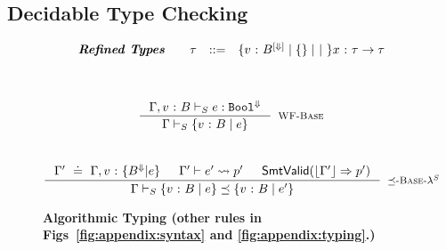 \subsection{Decidable Type Checking}
\begin{figure}[t!]
\centering
$$
\begin{array}{rrcl}
\textbf{\emph{Refined Types}} \quad
  & \tau
  & ::=   & \{ {v} \ \text{:}\ {B^{[\Downarrow]}} \mid {\ensuremath{\{ \} \mid \ \mid \  \}}} {x} \ \text{:}\ {\tau} \rightarrow \tau
\\[0.10in]
\end{array}
$$
\hfill{\fbox{\aiswellformed{\env}{\typ}}}\\
$$
\inference{
  \ahastype{\env,\tbind{v}{\btyp}}{\refa}{\tbool^{\tlabel}}
}{
  \aiswellformed{\env}{\tref{v}{\btyp}{\refa}}
}[\rwbase]
$$
\hfill{}\\
$$
\inference{
\env' \defeq \env,\tbind{v}{\{\btyp^\tlabel | \refa\}} &
\tologicshort{\env'}{\refa'}{\tbool}{\pred'}{}{}{} &
\smtvalid{\vcond{\env'}{\pred'}}
%
}{
 \aissubtype{\env}{\tref{v}{\btyp}{\refa}}{\tref{v}{\btyp}{\refa'}}
}[\rsubbase]
$$
\caption{\textbf{Algorithmic Typing (other rules in Figs~\ref{fig:appendix:syntax} and \ref{fig:appendix:typing}.)}}
\label{fig:modifications}
\end{figure}

